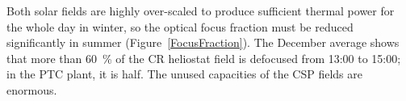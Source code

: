 
Both solar fields are highly over-scaled to produce sufficient thermal power for the whole day in winter, so the optical focus fraction must be reduced significantly in summer (Figure~\ref{FocusFraction}). The December average shows that more than \SI{60}{\percent} of the CR heliostat field is defocused from 13:00 to 15:00; in the PTC plant, it is half. The unused capacities of the CSP fields are enormous. 

